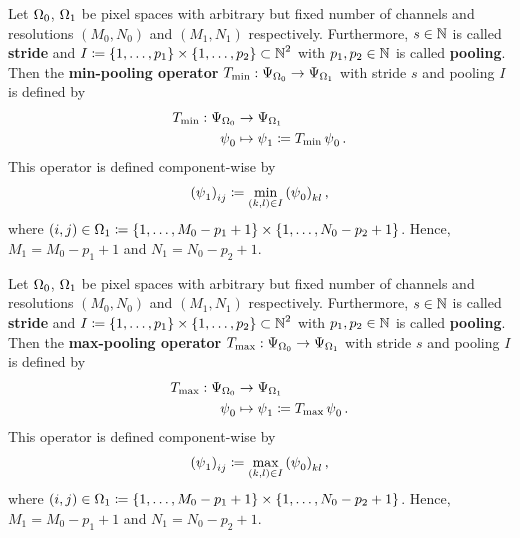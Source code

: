 \begin{definition}\label{def:min_pooling_op}
Let $\Omega_0$, $\Omega_1$ be pixel spaces with arbitrary but fixed number of channels and resolutions $(M_0,N_0)$ and $(M_1,N_1)$ respectively. Furthermore, $s\in\operatorname{\mathbb{N}}$ is called \textbf{stride} and $I\coloneqq \{1,\ldots,p_1\}\times \{1,\ldots,p_2\} \subset\operatorname{\mathbb{N}}^2$ with $p_1,p_2\in\operatorname{\mathbb{N}}$ is called \textbf{pooling}.\\
Then the \textbf{min-pooling operator} $T_{\text{min}}: \Psi_{\Omega_0} \to \Psi_{\Omega_1}$ with stride $s$ and pooling $I$ is defined by
\begin{align*}
T_{\text{min}}: \Psi_{\Omega_0} &\to \Psi_{\Omega_1} \\
\operatorname{\psi}_0 &\mapsto \operatorname{\psi}_1 \coloneqq T_{\text{min}}\operatorname{\psi}_0 .
\end{align*}
This operator is defined component-wise by
\begin{align}
\left(\operatorname{\psi}_1\right)_{ij} \coloneqq  \min_{(k,l)\in I} \left(\operatorname{\psi}_0\right)_{kl},
\end{align}
where $(i,j) \in \Omega_1 \coloneqq \{1,\ldots, M_0-p_1+1\} \times \{1,\ldots, N_0-p_2+1\}$. Hence, $M_1 = M_0-p_1+1$ and $N_1 = N_0-p_2+1$.
\end{definition}

\begin{definition}\label{def:max_pooling_op}
Let $\Omega_0$, $\Omega_1$ be pixel spaces with arbitrary but fixed number of channels and resolutions $(M_0,N_0)$ and $(M_1,N_1)$ respectively. Furthermore, $s\in\operatorname{\mathbb{N}}$ is called \textbf{stride} and $I\coloneqq \{1,\ldots,p_1\}\times \{1,\ldots,p_2\} \subset\operatorname{\mathbb{N}}^2$ with $p_1,p_2\in\operatorname{\mathbb{N}}$ is called \textbf{pooling}.\\
Then the \textbf{max-pooling operator} $T_{\text{max}}: \Psi_{\Omega_0} \to \Psi_{\Omega_1}$ with stride $s$ and pooling $I$ is defined by
\begin{align*}
T_{\text{max}}: \Psi_{\Omega_0} &\to \Psi_{\Omega_1} \\
\operatorname{\psi}_0 &\mapsto \operatorname{\psi}_1 \coloneqq T_{\text{max}}\operatorname{\psi}_0 .
\end{align*}
This operator is defined component-wise by
\begin{align}
\left(\operatorname{\psi}_1\right)_{ij} \coloneqq  \max_{(k,l)\in I} \left(\operatorname{\psi}_0\right)_{kl},
\end{align}
where $(i,j) \in \Omega_1 \coloneqq \{1,\ldots, M_0-p_1+1\} \times \{1,\ldots, N_0-p_2+1\}$. Hence, $M_1 = M_0-p_1+1$ and $N_1 = N_0-p_2+1$.
\end{definition}
